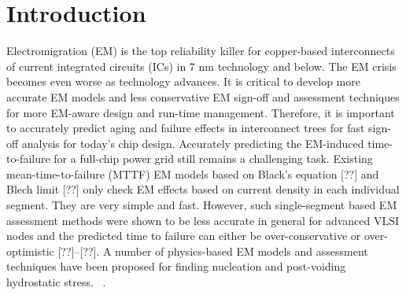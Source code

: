 \section{Introduction}
  \label{sec:intro}

Electromigration (EM) is the top reliability killer for copper-based interconnects of current integrated circuits (ICs) in 7 nm technology and below.
The EM crisis becomes even worse as technology advances.  
It is critical to develop more accurate EM models and less conservative EM sign-off and assessment techniques for more EM-aware design and run-time management.
Therefore, it is important to accurately predict aging and failure effects in interconnect trees for fast sign-off analysis for today's chip design.
Accurately predicting the EM-induced time-to-failure for a
full-chip power grid still remains a challenging task. Existing
mean-time-to-failure (MTTF) EM models based on Black’s
equation [??] and Blech limit [??] only check EM effects based
on current density in each individual segment. They are very
simple and fast. However, such single-segment based EM
assessment methods were shown to be less accurate in general
for advanced VLSI nodes and the predicted time to failure can
either be over-conservative or over-optimistic [??]–[??].
A number of physics-based EM models and assessment techniques have been proposed for finding nucleation and
post-voiding hydrostatic stress.
~\cite{HuangYu:DAC'14,SukharevHuang:ICCAD'14,MishraSapatnekar:2016DAC,HuangSukharev:ASPDAC'16,Huang:2017int,Chatterjee:2017ed,Abbasinasab:DAC'2018,TanTahoori:Book'19}.

